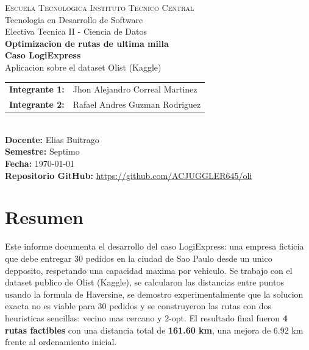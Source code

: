 \documentclass[11pt,a4paper]{article}
\begin{document}
\begin{titlepage}
\centering
\vspace*{2cm}

{\Large\textsc{Escuela Tecnologica Instituto Tecnico Central}}\\[0.4cm]
{\large Tecnologia en Desarrollo de Software}\\
{\large Electiva Tecnica II - Ciencia de Datos}\\[2.5cm]

{\LARGE\bfseries Optimizacion de rutas de ultima milla}\\[0.4cm]
{\Large\bfseries Caso LogiExpress}\\[0.4cm]
{\large Aplicacion sobre el dataset Olist (Kaggle)}\\[3cm]

\begin{tabular}{rl}
\textbf{Integrante 1:} & Jhon Alejandro Correal Martinez \\[6pt]
\textbf{Integrante 2:} & Rafael Andres Guzman Rodriguez \\
\end{tabular}\\[2cm]

\textbf{Docente:} Elias Buitrago\\
\textbf{Semestre:} Septimo\\
\textbf{Fecha:} \today\\
\textbf{Repositorio GitHub:} \url{https://github.com/ACJUGGLER645/oli}\\

\vfill
\end{titlepage}

\section*{Resumen}
Este informe documenta el desarrollo del caso LogiExpress: una empresa
ficticia que debe entregar 30 pedidos en la ciudad de Sao Paulo desde un
unico depposito, respetando una capacidad maxima por vehiculo. Se trabajo
con el dataset publico de Olist (Kaggle), se calcularon las distancias
entre puntos usando la formula de Haversine, se demostro experimentalmente
que la solucion exacta no es viable para 30 pedidos y se construyeron las
rutas con dos heuristicas sencillas: vecino mas cercano y 2-opt. El
resultado final fueron \textbf{4 rutas factibles} con una distancia total
de \textbf{161.60 km}, una mejora de 6.92 km frente al ordenamiento inicial.
\end{document}
